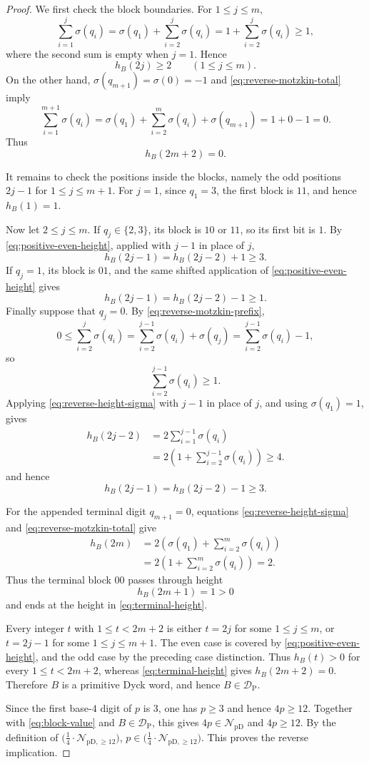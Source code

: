 \documentclass[12pt]{article}
\theoremstyle{plain}
\theoremstyle{definition}
\theoremstyle{plain}
\newcommand{\NpD}{\mathcal{N}_{\mathrm{pD}}}
\newcommand{\DP}{\mathcal{D}_{\mathrm{P}}}
\newcommand{\Pset}{%
  \bigl(\tfrac{1}{4}\cdot\mathcal{N}_{\mathrm{pD},\geq 12}\bigr)%
}
\begin{document}
\begin{proof}
We first check the block boundaries.  For $1\leq j\leq m$,
\[
 \sum_{i=1}^{j}\sigma(q_i)
 =\sigma(q_1)+\sum_{i=2}^{j}\sigma(q_i)
 =1+\sum_{i=2}^{j}\sigma(q_i)
 \geq1,
\]
where the second sum is empty when $j=1$.  Hence
\begin{equation}\label{eq:positive-even-height}
 h_B(2j)\geq2
 \qquad(1\leq j\leq m).
\end{equation}
On the other hand, $\sigma(q_{m+1})=\sigma(0)=-1$ and
\eqref{eq:reverse-motzkin-total} imply
\[
 \sum_{i=1}^{m+1}\sigma(q_i)
 =\sigma(q_1)+\sum_{i=2}^{m}\sigma(q_i)+\sigma(q_{m+1})
 =1+0-1=0.
\]
Thus
\begin{equation}\label{eq:terminal-height}
 h_B(2m+2)=0.
\end{equation}

It remains to check the positions inside the blocks, namely the odd positions
$2j-1$ for $1\leq j\leq m+1$.  For $j=1$, since $q_1=3$, the first block
is $11$, and hence $h_B(1)=1$.

Now let $2\leq j\leq m$.  If $q_j\in\{2,3\}$, its block is $10$ or $11$,
so its first bit is $1$.  By \eqref{eq:positive-even-height}, applied with
$j-1$ in place of $j$,
\[
 h_B(2j-1)=h_B(2j-2)+1\geq3.
\]
If $q_j=1$, its block is $01$, and the same shifted application of
\eqref{eq:positive-even-height} gives
\[
 h_B(2j-1)=h_B(2j-2)-1\geq1.
\]
Finally suppose that $q_j=0$.  By \eqref{eq:reverse-motzkin-prefix},
\[
 0\leq\sum_{i=2}^{j}\sigma(q_i)
 =\sum_{i=2}^{j-1}\sigma(q_i)+\sigma(q_j)
 =\sum_{i=2}^{j-1}\sigma(q_i)-1,
\]
so
\[
 \sum_{i=2}^{j-1}\sigma(q_i)\geq1.
\]
Applying \eqref{eq:reverse-height-sigma} with $j-1$ in place of $j$,
and using $\sigma(q_1)=1$, gives
\[
\begin{aligned}
 h_B(2j-2)
 &=2\sum_{i=1}^{j-1}\sigma(q_i)\\
 &=2\left(1+\sum_{i=2}^{j-1}\sigma(q_i)\right)
 \geq4.
\end{aligned}
\]
and hence
\[
 h_B(2j-1)=h_B(2j-2)-1\geq3.
\]

For the appended terminal digit $q_{m+1}=0$, equations
\eqref{eq:reverse-height-sigma} and
\eqref{eq:reverse-motzkin-total} give
\[
\begin{aligned}
 h_B(2m)
 &=2\left(\sigma(q_1)+\sum_{i=2}^{m}\sigma(q_i)\right)\\
 &=2\left(1+\sum_{i=2}^{m}\sigma(q_i)\right)
 =2.
\end{aligned}
\]
Thus the terminal block $00$ passes through height
\[
 h_B(2m+1)=1>0
\]
and ends at the height in \eqref{eq:terminal-height}.

Every integer $t$ with $1\leq t<2m+2$ is either $t=2j$ for some
$1\leq j\leq m$, or $t=2j-1$ for some $1\leq j\leq m+1$.
The even case is covered by \eqref{eq:positive-even-height}, and the odd
case by the preceding case distinction.  Thus $h_B(t)>0$ for every
$1\leq t<2m+2$, whereas \eqref{eq:terminal-height} gives
$h_B(2m+2)=0$.  Therefore $B$ is a primitive Dyck word, and hence
$B\in\DP$.

Since the first base-$4$ digit of $p$ is $3$, one has $p\geq3$ and hence
$4p\geq12$.  Together with \eqref{eq:block-value} and $B\in\DP$, this gives
$4p\in\NpD$ and $4p\geq12$.  By the definition of $\Pset$, $p\in\Pset$.
This proves the reverse implication.
\end{proof}
\end{document}
